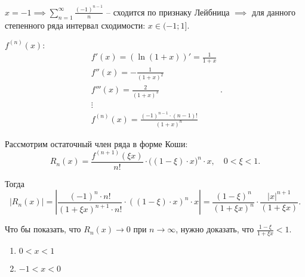 \begin{note}
\begin{enumerate}
              $x = -1 \implies \sum_{n=1}^{\infty}\frac{(-1)^{n-1}}{n}$ -- сходится по признаку Лейбница $\implies$ для данного степенного ряда интервал сходимости: $x \in (-1;1]$.

              $f^{(n)}(x):$
              \[
                  \begin{array}{l}
                      f'(x) = (\ln(1+x))' = \frac{1}{1 + x} \\
                      f''(x) = -\frac{1}{(1+x)^2}           \\
                      f'''(x) = \frac{2}{(1+x)^3}           \\
                      \vdots                                \\
                      f^{(n)}(x) = \frac{(-1)^{n-1}\cdot (n-1)!}{(1+x)^n}
                  \end{array}.
              \]

              Рассмотрим остаточный член ряда в форме Коши:
              \[
                  R_n(x) = \frac{f^{(n+1)}(\xi x)}{n!}\cdot \big((1-\xi) \cdot x\big)^n \cdot x, \quad 0 < \xi < 1.
              \]

              Тогда
              \[
                  \big|R_n(x)\big| = \left|\frac{(-1)^n \cdot n!}{(1 + \xi x)^{n+1} \cdot n!} \cdot ((1-\xi)\cdot x)^n \cdot x\right| = \frac{(1 - \xi)^n}{(1 + \xi x)^n} \cdot \frac{|x|^{n+1}}{(1 + \xi x)}.
              \]

              Что бы показать, что $R_n(x)\rightarrow 0$ при $n\rightarrow \infty$, нужно доказать, что $\frac{1 - \xi}{1 + \xi x}<1$.
              \begin{enumerate}
                  \item $0<x<1$

                        \begin{figure}[H]
                            \centering
                            \label{fig:fig_02}
                        \end{figure}

                  \item $-1<x<0$

                        \begin{figure}[H]
                            \centering
                            \label{fig:fig_32}
                        \end{figure}
              \end{enumerate}


\end{enumerate}
\end{note}
